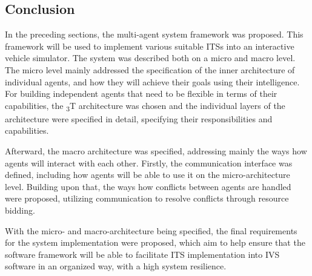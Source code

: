 \documentclass[0main.tex]{subfiles}
\begin{document}
\subsection{Conclusion}

In the preceding sections, the multi-agent system framework was proposed. This framework will be used to implement various 
suitable ITSs into an interactive vehicle simulator. The system was described both on a micro and macro level. The micro level 
mainly addressed the specification of the inner architecture of individual agents, and how they will achieve their goals using their 
intelligence. For building independent agents that need to be flexible in terms of their capabilities, the \textsubscript{3}T
architecture was chosen and the individual layers of the architecture were specified in detail, specifying their responsibilities
and capabilities. 

Afterward, the macro architecture was specified, addressing mainly the ways how agents will interact with each other. 
Firstly, the communication interface was defined, including how agents will be able to use it on the micro-architecture level.
Building upon that, the ways how conflicts between agents are handled were proposed, utilizing communication to resolve 
conflicts through resource bidding. 

With the micro- and macro-architecture being specified, the final requirements for the system implementation were proposed, 
which aim to help ensure that the software framework will be able to facilitate ITS implementation into IVS software in an 
organized way, with a high system resilience.

\clearpage
\end{document}
